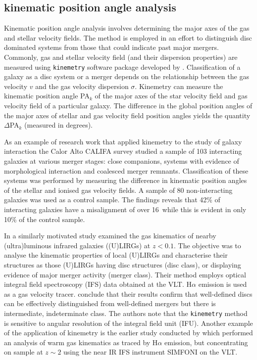 \subsection{kinematic position angle analysis}
Kinematic position angle analysis involves determining the major axes of the gas and stellar velocity fields. The method is employed in an effort to distinguish disc dominated systems from those that could indicate past major mergers. Commonly, gas and stellar velocity field (and their dispersion properties) are measured using \texttt{kinemetry} software package developed by \citet{2006MNRAS.366..787K}. Classification of a galaxy as a disc system or a merger depends on the relationship between the gas velocity $v$ and the gas velocity dispersion $\sigma$. Kinemetry can measure the kinematic position angle PA$_k$ of the major axes of the star velocity field and gas velocity field of a particular galaxy. The difference in the global position angles of the major axes of stellar and gas velocity field position angles yields the quantity $\Delta$PA$_k$ (measured in degrees). 

As an example of research work that applied kinemetry to the study of galaxy interaction the Calor Alto CALIFA survey \citet{2015A&A...582A..21B} studied a sample of 103 interacting galaxies at various merger stages: close companions, systems with evidence of morphological interaction and coalesced merger remnants. Classification of these systems was performed by measuring the difference in kinematic position angles of the stellar and ionised gas velocity fields. A sample of 80 non-interacting galaxies was used as a control sample. The findings reveals that 42\% of interacting galaxies have a misalignment of over 16\textdegree\ while this is evident in only 10\% of the control sample.

In a similarly motivated study \citet{2016A&A...591A..85B} examined the gas kinematics of nearby (ultra)luminous infrared galaxies ((U)LIRGs) at $z<0.1$. The objective was to analyse the kinematic properties of local (U)LIRGs and characterise their structures as those (U)LIRGs having disc structures (disc class), or displaying evidence of major merger activity (merger class). Their method employs optical integral field spectroscopy (IFS) data obtained at the VLT. H$\alpha$ emission is used as a gas velocity tracer. \citet{2016A&A...591A..85B} conclude that their results confirm that well-defined discs can be effectively distinguished from well-defined mergers but there is intermediate, indeterminate class. The authors note that the \texttt{kinemetry} method is sensitive to angular resolution of the integral field unit (IFU). Another example of the application of kinemetry is the earlier study conducted by \citet{2008ApJ...682..231S} which performed an  analysis of warm gas kinematics as traced by H$\alpha$ emission, but concentrating on sample at $z\sim2$ using the near IR IFS instrument SIMFONI on the VLT.

